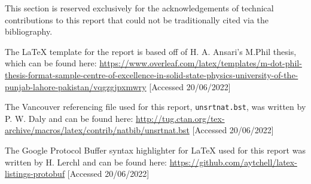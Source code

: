 This section is reserved exclusively for the acknowledgements of technical contributions to this report that could
not be traditionally cited via the bibliography.

The LaTeX template for the report is based off of H. A. Ansari's M.Phil thesis, which can be found here:
\url{https://www.overleaf.com/latex/templates/m-dot-phil-thesis-format-sample-centre-of-excellence-in-solid-state-physics-university-of-the-punjab-lahore-pakistan/vqgzgjpxmwry}
[Accessed 20/06/2022]

The Vancouver referencing file used for this report, \texttt{unsrtnat.bst}, was written by P. W. Daly and can be
found here: \url{http://tug.ctan.org/tex-archive/macros/latex/contrib/natbib/unsrtnat.bst} [Accessed 20/06/2022]

The Google Protocol Buffer syntax highlighter for LaTeX used for this report was written by H. Lerchl and can be
found here: \url{https://github.com/aytchell/latex-listings-protobuf} [Accessed 20/06/2022]
